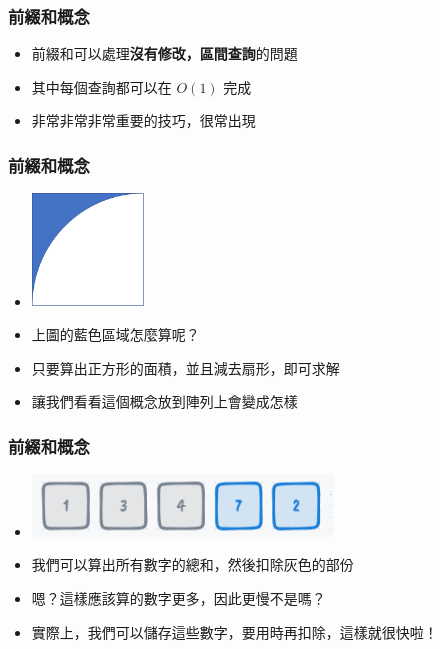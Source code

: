 \documentclass[mathserif]{beamer}
\begin{document}
\begin{frame}
    \frametitle{前綴和概念}
    \begin{itemize}
        \item 前綴和可以處理\textbf{沒有修改，區間查詢}的問題
        \item 其中每個查詢都可以在 $O(1)$ 完成
        \item 非常非常非常重要的技巧，很常出現
    \end{itemize}
\end{frame}

\begin{frame}
    \frametitle{前綴和概念}
    \begin{itemize}
        \item \includegraphics[width=3.0cm]{img/6-1.png}
        \item 上圖的藍色區域怎麼算呢？
        \item<2-> 只要算出正方形的面積，並且減去扇形，即可求解
        \item<2-> 讓我們看看這個概念放到陣列上會變成怎樣
    \end{itemize}
\end{frame}

\begin{frame}
    \frametitle{前綴和概念}
    \begin{itemize}
        \item \includegraphics[width=8.0cm]{img/6-2.png}
        \item 我們可以算出所有數字的總和，然後扣除灰色的部份
        \item<2-> 嗯？這樣應該算的數字更多，因此更慢不是嗎？
        \item<2-> 實際上，我們可以儲存這些數字，要用時再扣除，這樣就很快啦！
    \end{itemize}
\end{frame}
\end{document}
